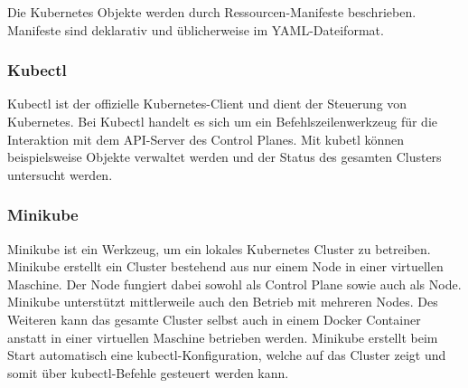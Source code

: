 Die Kubernetes Objekte werden durch Ressourcen-Manifeste beschrieben. Manifeste
sind deklarativ und üblicherweise im YAML-Dateiformat.

%
%
%
%
%
%
%

\subsubsection{Kubectl}

Kubectl ist der offizielle Kubernetes-Client und dient der Steuerung von Kubernetes. Bei Kubectl handelt es sich um ein Befehlszeilenwerkzeug für die Interaktion mit dem \ac{API}-Server des Control Planes. Mit kubetl können beispielsweise Objekte verwaltet werden und der Status des gesamten Clusters untersucht werden.

\subsubsection{Minikube}

Minikube ist ein Werkzeug, um ein lokales Kubernetes Cluster zu betreiben. Minikube erstellt ein Cluster bestehend aus nur einem Node in einer virtuellen Maschine. Der Node fungiert dabei sowohl als Control Plane sowie auch als Node. Minikube unterstützt mittlerweile auch den Betrieb mit mehreren Nodes. Des Weiteren kann das gesamte Cluster selbst auch in einem Docker Container anstatt in einer virtuellen Maschine betrieben werden. Minikube erstellt beim Start automatisch eine kubectl-Konfiguration, welche auf das Cluster zeigt und somit über kubectl-Befehle gesteuert werden kann. 